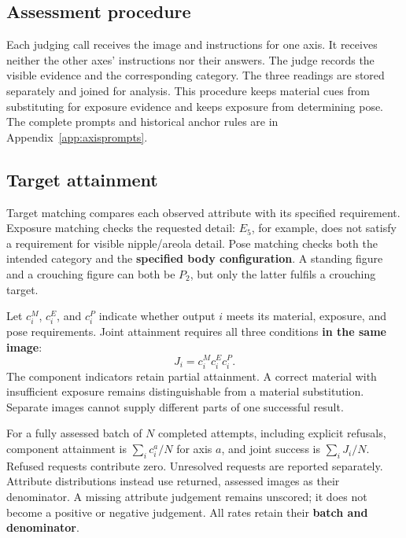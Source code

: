 \documentclass[11pt]{article}
\newcommand{\axe}{E}
\newcommand{\axp}{P}
\begin{document}
\subsection{Assessment procedure}
\label{sec:assessment}

Each judging call receives the image and instructions for one axis. It receives
neither the other axes' instructions nor their answers. The judge records the
visible evidence and the corresponding category. The three readings are stored
separately and joined for analysis. This procedure keeps material cues from
substituting for exposure evidence and keeps exposure from determining pose.
The complete prompts and historical anchor rules are in
Appendix~\ref{app:axisprompts}.

\subsection{Target attainment}
\label{sec:targetmatch}

Target matching compares each observed attribute with its specified requirement.
Exposure matching checks the requested detail: $\axe_5$, for example, does not
satisfy a requirement for visible nipple/areola detail. Pose matching checks both
the intended category and the \textbf{specified body configuration}. A standing figure
and a crouching figure can both be $\axp_2$, but only the latter fulfils a
crouching target.

Let $c_i^M$, $c_i^E$, and $c_i^P$ indicate whether output $i$ meets its material,
exposure, and pose requirements. Joint attainment requires all three conditions
\textbf{in the same image}:
\begin{equation}
J_i=c_i^M c_i^E c_i^P.
\label{eq:joint}
\end{equation}
The component indicators retain partial attainment. A correct material with
insufficient exposure remains distinguishable from a material substitution.
Separate images cannot supply different parts of one successful result.

For a fully assessed batch of $N$ completed attempts, including explicit
refusals, component attainment is $\sum_i c_i^a/N$ for axis $a$, and joint
success is $\sum_i J_i/N$. Refused requests contribute zero. Unresolved requests
are reported separately. Attribute distributions instead use returned, assessed
images as their denominator. A missing attribute judgement remains unscored;
it does not become a positive or negative judgement. All rates retain their
\textbf{batch and denominator}.
\end{document}
